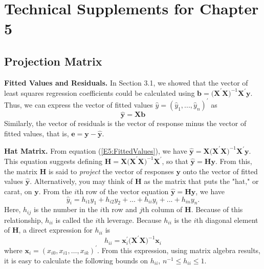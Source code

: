 \newpage

\section{Technical Supplements for Chapter 5}\label{S5:TechSupps}

\subsection{Projection Matrix}\label{S5:ProjMatrix}

\textbf{Fitted Values and Residuals.} In Section 3.1, we showed that
the vector of least squares regression coefficients could be
calculated using $\mathbf{b}=\mathbf{(X}^{\prime}\mathbf{X)}^{-1}\mathbf{X}^{\prime}\mathbf{y%
}$. Thus, we can express the vector of fitted values $\hat{y}=(\hat{y}%
_1,...,\hat{y}_{n})^{\prime}$ as
\begin{equation}\label{E5:FittedValues}
\mathbf{\hat{y}}=\mathbf{Xb}
\end{equation}
Similarly, the vector of residuals is the vector of response minus
the vector of fitted values, that is,
$\mathbf{e}=\mathbf{y-\hat{y}}$.

\textbf{Hat Matrix.} From equation (\ref{E5:FittedValues}), we have $\mathbf{\hat{y}}=%
\mathbf{X(X}^{\prime}\mathbf{X)}^{-1}\mathbf{X}^{\prime}\mathbf{y}$.
This
equation suggests defining $\mathbf{H}=\mathbf{X(X}^{\prime}\mathbf{X)}^{-1}%
\mathbf{X}^{\prime}$, so that $\mathbf{\hat{y}}=\mathbf{Hy}$. From
this,
the matrix $\mathbf{H}$ is said to \textit{project} the vector of responses $%
\mathbf{y}$ onto the vector of fitted values $\mathbf{\hat{y}}$.
Alternatively, you may think of $\mathbf{H}$ as the matrix that puts
the
"hat," or carat, on $\mathbf{y}$. From the $i$th row of the vector equation $%
\mathbf{\hat{y}=Hy}$, we have
\begin{equation*}
\hat{y}_i=h_{i1}y_1+h_{i2}y_2+...+h_{ii}y_i+...+h_{in}y_{n}.
\end{equation*}
Here, $h_{ij}$ is the number in the $i$th row and $j$th column of
$\mathbf{H} $. Because of this relationship, $h_{ii}$ is called
the $i$th leverage. Because $h_{ii}$ is the $i$th diagonal element of $%
\mathbf{H}$, a direct expression for $h_{ii}$ is
\begin{equation}\label{E5:Leverage}
h_{ii}=\mathbf{x}_i^{\prime}\mathbf{(X}^{\prime}\mathbf{X)}^{-1}\mathbf{x%
}_i
\end{equation} where
$\mathbf{x}_i=(x_{i0},x_{i1},\ldots,x_{ik})^{\prime}$. From this
expression, using matrix algebra results, it is easy to calculate
the following bounds on $h_{ii}$, $ n^{-1}\leq h_{ii}\leq 1.$


